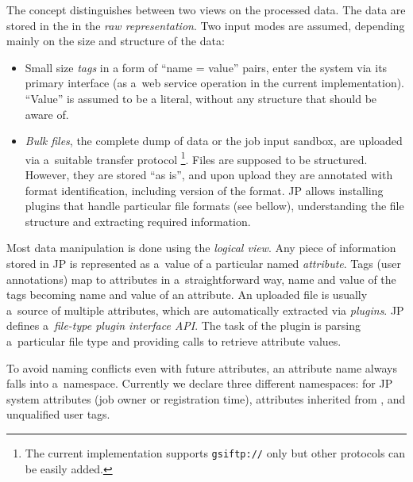 The \JP concept distinguishes between two views on the processed data. 
The data are stored in the \JP in the \emph{raw representation}.
Two input modes are assumed, depending mainly on the size
and structure of the data:
\begin{itemize}
\item Small size \emph{tags} in a form of ``name = value'' pairs,
enter the system via its primary interface (as a~web service operation
in the current implementation).
``Value'' is assumed to be a literal, without any structure that \JP should
be aware of.

\item \emph{Bulk files}, \eg the complete dump of \LB data or the job input
sandbox, are uploaded via a~suitable transfer protocol%
\footnote{The current implementation supports \texttt{gsiftp://} only but 
other protocols can be easily added.}.
Files are supposed to be structured.
However, they are stored ``as is'', and upon upload they are annotated with
format identification, including version of the format.
JP allows installing plugins that handle particular file formats (see bellow),
understanding the file structure and extracting required information.
\end{itemize}

Most data manipulation is done using the \emph{logical view}. 
Any piece of information stored in JP is represented
as a~value of a particular named \emph{attribute}. Tags (user
annotations) map to attributes in a~straightforward way, name and value
of the tags becoming name and value of an attribute. An uploaded file is
usually a~source of multiple attributes, which are automatically extracted
via \emph{plugins}. JP defines a~\emph{file-type plugin interface API}. The
task of the plugin is parsing a~particular file type and providing calls
to retrieve attribute values.

To avoid naming conflicts even with future attributes, 
an attribute name always falls into a~namespace.
Currently we declare three different namespaces: for JP system attributes
(\eg job owner or
registration time), attributes inherited from \LB, and unqualified user tags.

